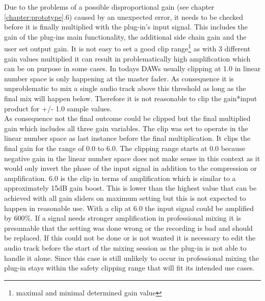 Due to the problems of a possible disproportional gain (see chapter \ref{chapter:prototype}.6) caused by an unexpected error, it needs to be checked before it is finally multiplied with the plug-in’s input signal. This includes the gain of the plug-ins main functionality, the additional side chain gain and the user set output gain. It is not easy to set a good clip range\footnote{maximal and minimal determined gain value} as with 3 different gain values multiplied it can result in problematically high amplification which can be on purpose in some cases. In todays DAWs usually clipping at 1.0 in linear number space is only happening at the master fader. As consequence it is unproblematic to mix a single audio track above this threshold as long as the final mix will happen below. Therefore it is not reasonable to clip the gain*input product for +/- 1.0 sample values.\\
As consequence not the final outcome could be clipped but the final multiplied gain which includes all three gain variables. The clip was set to operate in the linear number space as last instance before the final multiplication. It clips the final gain for the range of 0.0 to 6.0. The clipping range starts at 0.0 because negative gain in the linear number space does not make sense in this context as it would only invert the phase of the input signal in addition to the compression or amplification. 6.0 is the clip in terms of amplification which is similar to a approximately 15dB gain boost. This is lower than the highest value that can be achieved with all gain sliders on maximum setting but this is not expected to happen in reasonable use. With a clip at 6.0 the input signal could be amplified by 600\%. If a signal needs stronger amplification in professional mixing it is presumable that the setting was done wrong or the recording is bad and should be replaced. If this could not be done or is not wanted it is necessary to edit the audio track before the start of the mixing session as the plug-in is not able to handle it alone. Since this case is still unlikely to occur in professional mixing the plug-in stays within the safety clipping range that will fit its intended use cases.\\